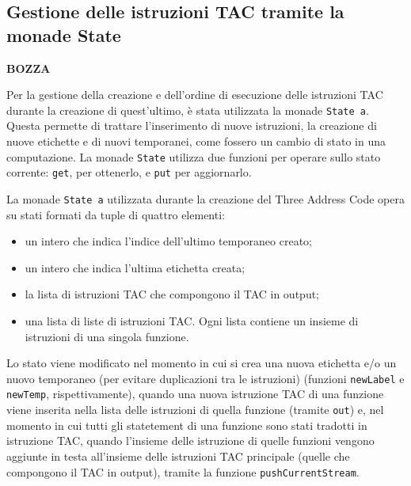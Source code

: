 \subsection{Gestione delle istruzioni TAC tramite la monade State}
\begin{center}
    {\bf BOZZA}
\end{center}

Per la gestione della creazione e dell'ordine di esecuzione delle istruzioni TAC durante la creazione di quest'ultimo, è stata utilizzata la monade {\tt State a}. Questa permette di trattare l'inserimento di nuove istruzioni, la creazione di nuove etichette e di nuovi temporanei, come fossero un cambio di stato in una computazione. La monade {\tt State} utilizza due funzioni per operare sullo stato corrente: {\tt get}, per ottenerlo, e {\tt put} per aggiornarlo. 

La monade {\tt State a} utilizzata durante la creazione del Three Address Code opera su stati formati da tuple di quattro elementi:
\begin{itemize}
    \item un intero che indica l'indice dell'ultimo temporaneo creato;
    \item un intero che indica l'ultima etichetta creata;
    \item la lista di istruzioni TAC che compongono il TAC in output;
    \item una lista di liste di istruzioni TAC. Ogni lista contiene un insieme di istruzioni di una singola funzione. 
\end{itemize}

Lo stato viene modificato nel momento in cui si crea una nuova etichetta e/o un nuovo temporaneo (per evitare duplicazioni tra le istruzioni) (funzioni {\tt newLabel} e {\tt newTemp}, rispettivamente), quando una nuova istruzione TAC di una funzione viene inserita nella lista delle istruzioni di quella funzione (tramite {\tt out}) e, nel momento in cui tutti gli statetement di una funzione sono stati tradotti in istruzione TAC, quando l'insieme delle istruzione di quelle funzioni vengono aggiunte in testa all'insieme delle istruzioni TAC principale (quelle che compongono il TAC in output), tramite la funzione {\tt pushCurrentStream}.